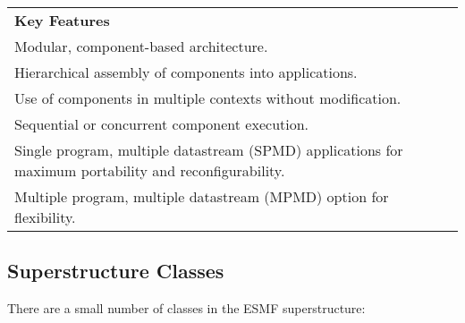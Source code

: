 \begin{center}  
\begin{tabular}{|p{6in}|}
\hline
\vspace{.01in}
{\bf Key Features} \\[.01in]
Modular, component-based architecture. \\
Hierarchical assembly of components into applications.\\
Use of components in multiple contexts without modification.\\
Sequential or concurrent component execution.\\
Single program, multiple datastream (SPMD) applications for 
maximum portability and reconfigurability.\\
Multiple program, multiple datastream (MPMD) option for 
flexibility.\\ [.03in] \hline
\end{tabular}
\end{center}

\subsection{Superstructure Classes}

There are a small number of classes in the ESMF superstructure:

